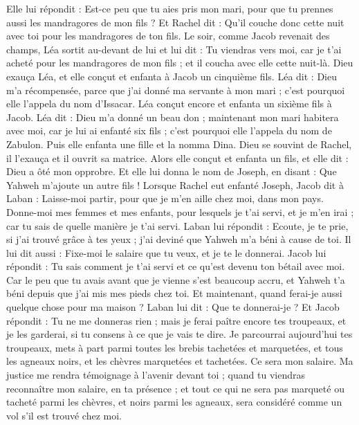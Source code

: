 \begin{multicols}{2}
Elle lui répondit : Est-ce peu que tu aies pris mon mari, pour que tu prennes aussi les mandragores de mon fils ? Et Rachel dit : Qu'il couche donc cette nuit avec toi pour les mandragores de ton fils.
Le soir, comme Jacob revenait des champs, Léa sortit au-devant de lui et lui dit : Tu viendras vers moi, car je t'ai acheté pour les mandragores de mon fils ; et il coucha avec elle cette nuit-là.
Dieu exauça Léa, et elle conçut et enfanta à Jacob un cinquième fils.
Léa dit : Dieu m'a récompensée, parce que j'ai donné ma servante à mon mari ; c'est pourquoi elle l’appela du nom d’Issacar.
Léa conçut encore et enfanta un sixième fils à Jacob.
Léa dit : Dieu m'a donné un beau don ; maintenant mon mari habitera avec moi, car je lui ai enfanté six fils ; c'est pourquoi elle l’appela du nom de Zabulon.
Puis elle enfanta une fille et la nomma Dina.
Dieu se souvint de Rachel, il l’exauça et il ouvrit sa matrice.
Alors elle conçut et enfanta un fils, et elle dit : Dieu a ôté mon opprobre.
Et elle lui donna le nom de Joseph, en disant : Que Yahweh m'ajoute un autre fils !
Lorsque Rachel eut enfanté Joseph, Jacob dit à Laban : Laisse-moi partir, pour que je m’en aille chez moi, dans mon pays.
Donne-moi mes femmes et mes enfants, pour lesquels je t'ai servi, et je m'en irai ; car tu sais de quelle manière je t'ai servi.
Laban lui répondit : Ecoute, je te prie, si j'ai trouvé grâce à tes yeux ; j’ai deviné que Yahweh m'a béni à cause de toi.
Il lui dit aussi : Fixe-moi le salaire que tu veux, et je te le donnerai.
Jacob lui répondit : Tu sais comment je t'ai servi et ce qu'est devenu ton bétail avec moi.
Car le peu que tu avais avant que je vienne s’est beaucoup accru, et Yahweh t'a béni depuis que j’ai mis mes pieds chez toi. Et maintenant, quand ferai-je aussi quelque chose pour ma maison ?
Laban lui dit : Que te donnerai-je ? Et Jacob répondit : Tu ne me donneras rien ; mais je ferai paître encore tes troupeaux, et je les garderai, si tu consens à ce que je vais te dire.
Je parcourrai aujourd'hui tes troupeaux, mets à part parmi toutes les brebis tachetées et marquetées, et tous les agneaux noirs, et les chèvres marquetées et tachetées. Ce sera mon salaire.
Ma justice me rendra témoignage à l’avenir devant toi ; quand tu viendras reconnaître mon salaire, en ta présence ; et tout ce qui ne sera pas marqueté ou tacheté parmi les chèvres, et noirs parmi les agneaux, sera considéré comme un vol s'il est trouvé chez moi.

\end{multicols}
